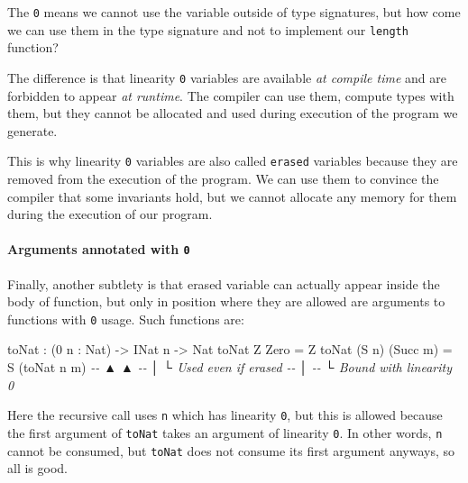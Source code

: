 \documentclass[
]{article}
\newenvironment{Shaded}{}{}
\newcommand{\CommentTok}[1]{\textcolor[rgb]{0.38,0.63,0.69}{\textit{#1}}}
\newcommand{\DataTypeTok}[1]{\textcolor[rgb]{0.56,0.13,0.00}{#1}}
\newcommand{\DecValTok}[1]{\textcolor[rgb]{0.25,0.63,0.44}{#1}}
\newcommand{\NormalTok}[1]{#1}
\newcommand{\OperatorTok}[1]{\textcolor[rgb]{0.40,0.40,0.40}{#1}}
\newcommand{\OtherTok}[1]{\textcolor[rgb]{0.00,0.44,0.13}{#1}}
\begin{document}
The \texttt{0} means we cannot use the variable outside of type
signatures, but how come we can use them in the type signature and not
to implement our \texttt{length} function?

The difference is that linearity \texttt{0} variables are available
\emph{at compile time} and are forbidden to appear \emph{at runtime}.
The compiler can use them, compute types with them, but they cannot be
allocated and used during execution of the program we generate.

This is why linearity \texttt{0} variables are also called
\texttt{erased} variables because they are removed from the execution of
the program. We can use them to convince the compiler that some
invariants hold, but we cannot allocate any memory for them during the
execution of our program.

\hypertarget{arguments-annotated-with-0}{%
\paragraph{\texorpdfstring{Arguments annotated with
\texttt{0}}{Arguments annotated with 0}}\label{arguments-annotated-with-0}}

Finally, another subtlety is that erased variable can actually appear
inside the body of function, but only in position where they are allowed
are arguments to functions with \texttt{0} usage. Such functions are:

\begin{Shaded}
\begin{Highlighting}[]
\NormalTok{toNat }\OperatorTok{:}\NormalTok{ (}\DecValTok{0}\NormalTok{ n }\OperatorTok{:} \DataTypeTok{Nat}\NormalTok{) }\OtherTok{{-}\textgreater{}} \DataTypeTok{INat}\NormalTok{ n }\OtherTok{{-}\textgreater{}} \DataTypeTok{Nat}
\NormalTok{toNat }\DataTypeTok{Z} \DataTypeTok{Zero} \OtherTok{=} \DataTypeTok{Z}
\NormalTok{toNat (}\DataTypeTok{S}\NormalTok{ n) (}\DataTypeTok{Succ}\NormalTok{ m) }\OtherTok{=} \DataTypeTok{S}\NormalTok{ (toNat n m)}
\CommentTok{{-}{-}       ▲                      ▲}
\CommentTok{{-}{-}       │                      └ Used even if erased}
\CommentTok{{-}{-}       │}
\CommentTok{{-}{-}       └ Bound with linearity 0}
\end{Highlighting}
\end{Shaded}

Here the recursive call uses \texttt{n} which has linearity \texttt{0},
but this is allowed because the first argument of \texttt{toNat} takes
an argument of linearity \texttt{0}. In other words, \texttt{n} cannot
be consumed, but \texttt{toNat} does not consume its first argument
anyways, so all is good.
\end{document}
